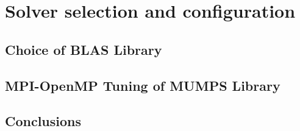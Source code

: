 \chapter{Solver selection and configuration}
\label{chapter:solver configuration}

























	
	
	





\section{Choice of BLAS Library}
\label{subseq:blas-comparison}




\section{MPI-OpenMP Tuning of MUMPS Library}
\label{subseq:mpi-openmp}


\section{Conclusions}
\label{subseq:conclusions}







